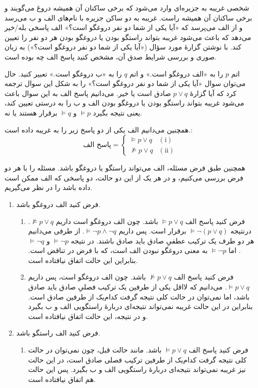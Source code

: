 شخصی غریبه به جزیره‌ای وارد می‌شود که برخی ساکنان آن همیشه دروغ می‌گویند و برخی ساکنان آن همیشه راست. غریبه به دو ساکن جزیره با نام‌های الف و ب می‌رسد و از الف می‌پرسد که «آیا یکی از شما دو نفر دروغگو است؟» الف پاسخی بله/خیر می‌دهد که باعث می‌شود غریبه بتواند راستگو بودن یا دروغگو بودن هر دو نفر را تعیین کند. با نوشتن گزارهٔ مورد سؤال («آیا یکی از شما دو نفر دروغگو است؟») به زبان صوری و بررسی شرایط صدق آن، مشخص کنید پاسخ الف چه بوده است.
\begin{ans}
  اتم‌
  $p$
  را به «الف دروغگو است.» و اتم
  $q$
  را به «ب دروغگو است.» تعبیر کنید. حال می‌توان سوال «آیا یکی از شما دو نفر دروغگو است؟» را به شکل این سوال ترجمه کرد که آیا گزارهٔ $p \vee q$ صادق است یا خیر. می‌دانیم پاسخ الف به این سوال باعث می‌شود غریبه بتواند راستگو بودن یا دروغگو بودن الف و ب را به درستی تعیین کند، یعنی نتیجه بگیرد
  $\models p$
  و
  $\models q$
  برقرار هستند یا نه.
  
  همچنین می‌دانیم الف یکی از دو پاسخ زیر را به غریبه داده است.:
  \[ \text{پاسخ الف} =
    \begin{cases}
      \models p \vee q & (\text{i}) \\
      \not \models p \vee q & (\text{ii})
    \end{cases}
  \]

همچنین طبق فرض مسئله، الف می‌تواند راستگو یا دروغگو باشد. مسئله را با هر دو فرض بررسی می‌کنیم، و در هر یک از این دو حالت، دو پاسخی که الف ممکن است داده باشد را در نظر می‌گیریم.
  \begin{enumerate}
    \item فرض کنید الف دروغگو باشد.
    \begin{enumerate}
      \item فرض کنید پاسخ الف $\models p \vee q$
      باشد. چون الف دروغگو است داریم
      $\not \models p \vee q$.
      درنتیجه
      $\models \neg (p \vee q)$
      برقرار است. پس داریم
      $\models \neg p \wedge \neg q$.
      از طرفی می‌دانیم هر دو طرف یک ترکیب عطفیِ صادق باید صادق باشند. در نتیجه
      $\models \neg p$
      و
      $\models \neg q$.
      اما
      $\models \neg p$
      به معنی دروغگو نبودن الف است، که با فرض در تناقض است. بنابراین این حالت اتفاق نیافتاده است.
      
      \item فرض کنید پاسخ الف $\not \models p \vee q$
      باشد. چون الف دروغگو است، پس داریم
      $\models p \vee q$.
      می‌دانیم که لااقل یکی از طرفین یک ترکیب فصلیِ صادق باید صادق باشد، اما نمی‌توان در حالت کلی نتیجه گرفت کدام‌یک از طرفین صادق است. بنابراین در این حالت غریبه نمی‌تواند نتیجه‌ای دربارهٔ راستگویی الف و ب بگیرد و در نتیجه، این حالت اتفاق نیافتاده است.
    \end{enumerate}
    \item فرض کنید الف راستگو باشد.
    \begin{enumerate}
      \item فرض کنید پاسخ الف $\models p \vee q$
      باشد. مانند حالت قبل، چون نمی‌توان در حالت کلی نتیجه گرفت کدام‌یک از طرفین ترکیب فصلی صادق است، در این حالت نیز غریبه نمی‌تواند نتیجه‌ای دربارهٔ راستگویی الف و ب بگیرد. پس این حالت هم اتفاق نیافتاده است.


\end{enumerate}
\end{enumerate}
\end{ans}
